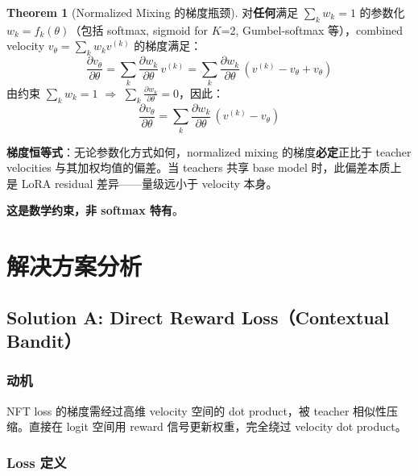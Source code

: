 \documentclass[11pt,a4paper]{article}
\theoremstyle{definition}
\newtheorem{theorem}{Theorem}
\begin{document}
\begin{theorem}[Normalized Mixing 的梯度瓶颈]
\label{thm:fundamental_limit}
对\textbf{任何}满足 $\sum_k w_k = 1$ 的参数化 $w_k = f_k(\theta)$（包括 softmax, sigmoid for $K$=2, Gumbel-softmax 等），combined velocity $v_\theta = \sum_k w_k v^{(k)}$ 的梯度满足：
\begin{equation}
\frac{\partial v_\theta}{\partial \theta} = \sum_k \frac{\partial w_k}{\partial \theta}\, v^{(k)} = \sum_k \frac{\partial w_k}{\partial \theta}\, (v^{(k)} - v_\theta + v_\theta)
\end{equation}
由约束 $\sum_k w_k = 1$ $\Rightarrow$ $\sum_k \frac{\partial w_k}{\partial \theta} = 0$，因此：
\begin{equation}
\boxed{
\frac{\partial v_\theta}{\partial \theta} = \sum_k \frac{\partial w_k}{\partial \theta}\, (v^{(k)} - v_\theta)
}
\label{eq:normalized_constraint}
\end{equation}

\textbf{梯度恒等式}：无论参数化方式如何，normalized mixing 的梯度\textbf{必定}正比于 teacher velocities 与其加权均值的偏差。当 teachers 共享 base model 时，此偏差本质上是 LoRA residual 差异——量级远小于 velocity 本身。

\textbf{这是数学约束，非 softmax 特有}。
\end{theorem}

\section{解决方案分析}
\label{sec:solutions}

\subsection{Solution A: Direct Reward Loss（Contextual Bandit）}

\subsubsection{动机}
NFT loss 的梯度需经过高维 velocity 空间的 dot product，被 teacher 相似性压缩。直接在 logit 空间用 reward 信号更新权重，完全绕过 velocity dot product。

\subsubsection{Loss 定义}
\end{document}
